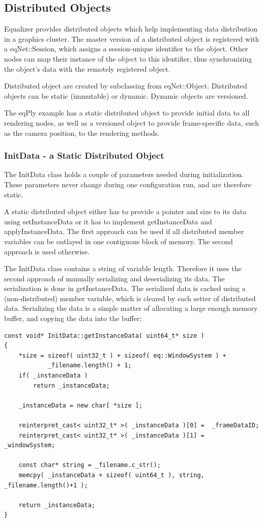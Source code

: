 \documentclass[10pt,a4]{scrartcl}
\begin{document}
\subsection{Distributed Objects}

Equalizer provides distributed objects which help implementing data
distribution in a graphics cluster. The master version of a distributed
object is registered with a \textsf{eqNet::Session}, which assigns a
session-unique identifier to the object. Other nodes can map their
instance of the object to this identifier, thus synchronizing the
object's data with the remotely registered object.

Distributed object are created by subclassing from
\textsf{eqNet::Object}. Distributed objects can be static (immutable) or
dynamic. Dynamic objects are versioned.

The \textsf{eqPly} example has a static distributed object to provide
initial data to all rendering nodes, as well as a versioned object to
provide frame-specific data, such as the camera position, to the
rendering methods.

\subsubsection{InitData - a Static Distributed Object}

The \textsf{InitData} class holds a couple of parameters needed during
initialization. These parameters never change during one configuration
run, and are therefore static.

A static distributed object either has to provide a pointer and size to
its data using \textsf{setInstanceData} or it has to implement
\textsf{getInstanceData} and \textsf{applyInstanceData}. The first
approach can be used if all distributed member variables can be outlayed
in one contiguous block of memory. The second approach is used
otherwise.

The \textsf{InitData} class contains a string of variable
length. Therefore it uses the second approach of manually serializing
and deserializing its data. The serialization is done in
\textsf{getInstanceData}. The serialized data is cached using a
(non-distributed) member variable, which is cleared by each setter of
distributed data. Serializing the data is a simple matter of allocating
a large enough memory buffer, and copying the data into the buffer:

{\footnotesize\begin{lstlisting}
const void* InitData::getInstanceData( uint64_t* size )
{
    *size = sizeof( uint32_t ) + sizeof( eq::WindowSystem ) +
            _filename.length() + 1;
    if( _instanceData )
        return _instanceData;

    _instanceData = new char[ *size ];

    reinterpret_cast< uint32_t* >( _instanceData )[0] =  _frameDataID;
    reinterpret_cast< uint32_t* >( _instanceData )[1] =  _windowSystem;

    const char* string = _filename.c_str();
    memcpy( _instanceData + sizeof( uint64_t ), string, _filename.length()+1 );

    return _instanceData;
}
\end{lstlisting}}
\end{document}
